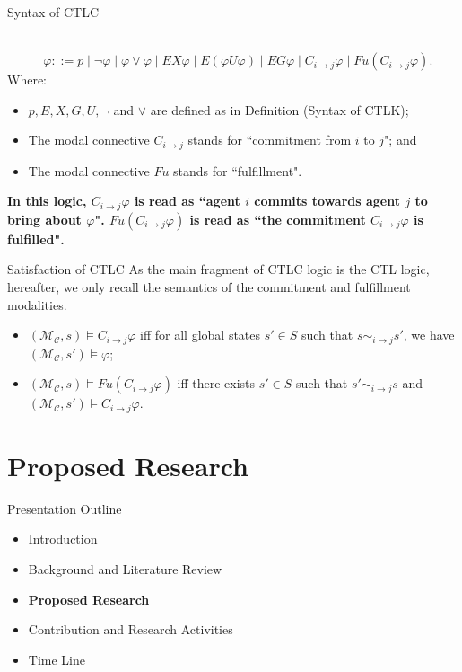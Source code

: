 \documentclass{beamer}
\begin{document}
\begin{frame} {Syntax of CTLC}
\begin{definition}~\\
$ ~~~~~~~~~~~~~\varphi ::= p \mid \neg \varphi \mid \varphi \vee
\varphi \mid EX \varphi  \mid E ( \varphi U \varphi) \mid EG
\varphi \mid C_{i\rightarrow j} \varphi \mid Fu (C_{i\rightarrow
j}\varphi)$.
\label {dfn: Syntax of CTLC}\\
Where:
\begin{itemize}
  \item $ p, E, X, G, U, \neg $ and $\vee$ are defined as in Definition (Syntax of CTLK);
  \item The modal connective $C_{i \rightarrow j}$ stands for ``commitment from $i$ to $j$"; and
  \item The modal connective $Fu$ stands for ``fulfillment".
\end{itemize}
\end{definition}
\textbf{In this logic, $C_{i\rightarrow j}\varphi$ is read as ``agent $i$ commits towards agent $j$ to bring about $\varphi$". $Fu (C_{i\rightarrow j}\varphi)$ is read as ``the commitment $C_{i\rightarrow j}\varphi$ is fulfilled".}
\end{frame}
\begin{frame} {Satisfaction of CTLC}
As the main fragment of CTLC logic is the CTL logic, hereafter, we only recall the semantics of the commitment and fulfillment modalities.
\begin{itemize}
\item $ (\mathcal{M_C}, s ) \models C_{i\rightarrow j} \varphi $ iff for all global states $ s' \in S $ such that $ s \sim_{i \rightarrow j} s' $, we have $ (\mathcal{M_C}, s' ) \models \varphi $;
\item $ (\mathcal{M_C}, s ) \models Fu (C_{i\rightarrow j} \varphi)$ iff there exists $ s' \in S $ such that $ s' \sim_{i \rightarrow j} s $ and $ (\mathcal{M_C}, s' ) \models C_{i\rightarrow j} \varphi$.
\end{itemize}
\end{frame}
\section{Proposed Research}
\begin{frame}{Presentation Outline}
    \begin{itemize}
     	\itemsep=.5cm
    	\item Introduction
    	\item Background and Literature Review
    	\item {\bf Proposed Research}
        \item Contribution and Research Activities
    	\item Time Line
    \end{itemize}
\end{frame}
\end{document}
